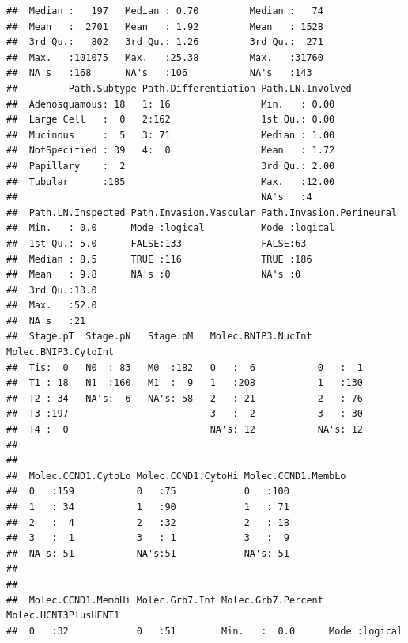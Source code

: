 \documentclass{article}\usepackage[]{graphicx}\usepackage[]{color}
\makeatletter
\newenvironment{kframe}{%
 \def\at@end@of@kframe{}%
 \ifinner\ifhmode%
  \def\at@end@of@kframe{\end{minipage}}%
  \begin{minipage}{\columnwidth}%
 \fi\fi%
 \def\FrameCommand##1{\hskip\@totalleftmargin \hskip-\fboxsep
 \colorbox{shadecolor}{##1}\hskip-\fboxsep
     \hskip-\linewidth \hskip-\@totalleftmargin \hskip\columnwidth}%
 \MakeFramed {\advance\hsize-\width
   \@totalleftmargin\z@ \linewidth\hsize
   \@setminipage}}%
 {\par\unskip\endMakeFramed%
 \at@end@of@kframe}
\newenvironment{knitrout}{}{} %
\makeatother
\begin{document}
\begin{knitrout}
\begin{kframe}
\begin{verbatim}
##  Median :   197   Median : 0.70         Median :   74    
##  Mean   :  2701   Mean   : 1.92         Mean   : 1528    
##  3rd Qu.:   802   3rd Qu.: 1.26         3rd Qu.:  271    
##  Max.   :101075   Max.   :25.38         Max.   :31760    
##  NA's   :168      NA's   :106           NA's   :143      
##         Path.Subtype Path.Differentiation Path.LN.Involved
##  Adenosquamous: 18   1: 16                Min.   : 0.00   
##  Large Cell   :  0   2:162                1st Qu.: 0.00   
##  Mucinous     :  5   3: 71                Median : 1.00   
##  NotSpecified : 39   4:  0                Mean   : 1.72   
##  Papillary    :  2                        3rd Qu.: 2.00   
##  Tubular      :185                        Max.   :12.00   
##                                           NA's   :4       
##  Path.LN.Inspected Path.Invasion.Vascular Path.Invasion.Perineural
##  Min.   : 0.0      Mode :logical          Mode :logical           
##  1st Qu.: 5.0      FALSE:133              FALSE:63                
##  Median : 8.5      TRUE :116              TRUE :186               
##  Mean   : 9.8      NA's :0                NA's :0                 
##  3rd Qu.:13.0                                                     
##  Max.   :52.0                                                     
##  NA's   :21                                                       
##  Stage.pT  Stage.pN   Stage.pM   Molec.BNIP3.NucInt Molec.BNIP3.CytoInt
##  Tis:  0   N0  : 83   M0  :182   0   :  6           0   :  1           
##  T1 : 18   N1  :160   M1  :  9   1   :208           1   :130           
##  T2 : 34   NA's:  6   NA's: 58   2   : 21           2   : 76           
##  T3 :197                         3   :  2           3   : 30           
##  T4 :  0                         NA's: 12           NA's: 12           
##                                                                        
##                                                                        
##  Molec.CCND1.CytoLo Molec.CCND1.CytoHi Molec.CCND1.MembLo
##  0   :159           0   :75            0   :100          
##  1   : 34           1   :90            1   : 71          
##  2   :  4           2   :32            2   : 18          
##  3   :  1           3   : 1            3   :  9          
##  NA's: 51           NA's:51            NA's: 51          
##                                                          
##                                                          
##  Molec.CCND1.MembHi Molec.Grb7.Int Molec.Grb7.Percent Molec.HCNT3PlusHENT1
##  0   :32            0   :51        Min.   :  0.0      Mode :logical       

\end{verbatim}
\end{kframe}
\end{knitrout}
\end{document}
